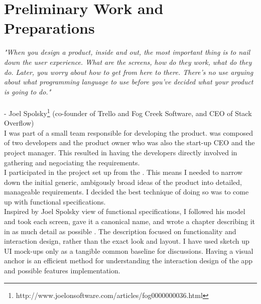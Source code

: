 



\section{Preliminary Work and Preparations}



{\em "When you design a product, inside and out, the most important thing is to nail down the user experience. What are the screens, how do they work, what do they do. Later, you worry about how to get from here to there. There's no use arguing about what programming language to use before you've decided what your product is going to do."}\\ \\  - Joel Spolsky\footnote{http://www.joelonsoftware.com/articles/fog0000000036.html} (co-founder of Trello and Fog Creek Software, and CEO of Stack Overflow) \\



I was part of a small team responsible for developing the product.  was composed of two developers and the product owner who was also the start-up CEO and the project manager. This resulted in having the developers directly involved in gathering and negociating the requirements.\\

I participated in the project set up from the . This means I needed to narrow down the initial generic, ambigously broad ideas of the product into detailed, manageable requirements. I decided the best technique of doing so was to come up with functional specifications.\\

Inspired by Joel Spolsky view of functional specifications, I followed his model and took each screen, gave it a canonical name, and wrote a chapter describing it in as much detail as possible . The description focused on functionality and interaction design, rather than the exact look and layout. I have used sketch up UI mock-ups only as a tangible common baseline for discussions. Having a visual anchor is an efficient method for understanding the interaction design of the app and possible features implementation.\\

